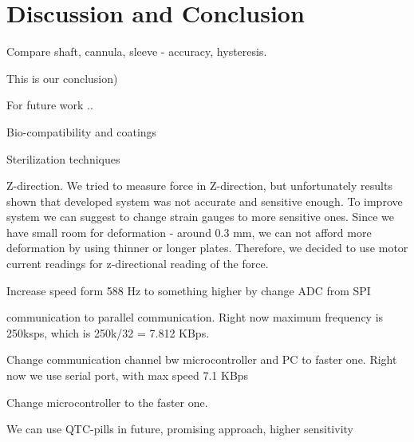\chapter{Discussion and Conclusion}
\label{discuss} %

Compare shaft, cannula, sleeve - accuracy, hysteresis.

This is our conclusion)

For future work ..

Bio-compatibility and coatings

Sterilization techniques

Z-direction. We tried to measure force in Z-direction, but unfortunately results shown that developed system was not accurate and sensitive enough. To improve system we can suggest to change strain gauges to more sensitive ones. Since we have small room for deformation - around 0.3 mm, we can not afford more deformation by using thinner or longer plates. Therefore, we decided to use motor current readings for z-directional reading of the force.

Increase speed form 588 Hz to something higher by change ADC from SPI 

communication to parallel communication. Right now maximum frequency is 
250ksps, which is 250k/32 = 7.812 KBps.

 Change communication channel bw microcontroller and PC to faster one. Right 
 now we use serial port, with max speed 7.1 KBps 
 
Change microcontroller to the faster one. 

We can use QTC-pills in future, promising approach, higher sensitivity 